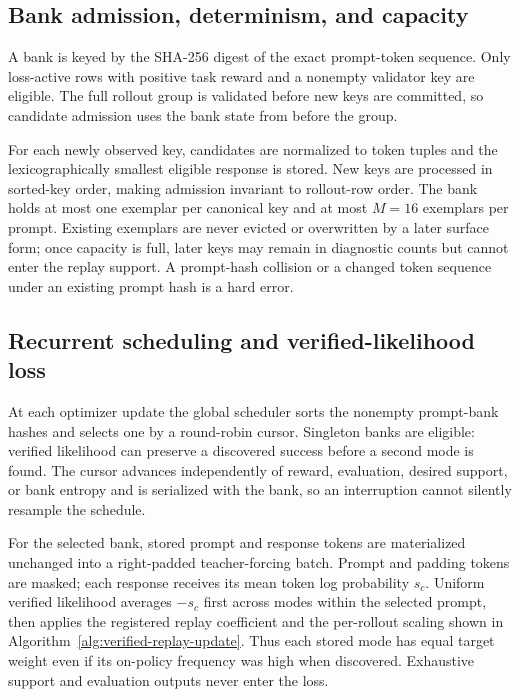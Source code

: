 \documentclass{article}
\newcommand{\1}{\mathbf 1}
\theoremstyle{remark}
\theoremstyle{definition}
\theoremstyle{plain}
\begin{document}
\subsection{Bank admission, determinism, and capacity}
\label{app:algorithm-bank}

A bank is keyed by the SHA-256 digest of the exact prompt-token sequence.
Only loss-active rows with positive task reward and a nonempty validator key
are eligible. The full rollout group is validated before new keys are
committed, so candidate admission uses the bank state from before the group.

For each newly observed key, candidates are normalized to token tuples and the
lexicographically smallest eligible response is stored. New keys are processed
in sorted-key order, making admission invariant to rollout-row order. The bank
holds at most one exemplar per canonical key and at most $M=16$ exemplars per
prompt. Existing exemplars are never evicted or overwritten by a later surface
form; once capacity is full, later keys may remain in diagnostic counts but
cannot enter the replay support. A prompt-hash collision or a changed token
sequence under an existing prompt hash is a hard error.

\subsection{Recurrent scheduling and verified-likelihood loss}
\label{app:algorithm-schedule}

At each optimizer update the global scheduler sorts the nonempty prompt-bank
hashes and selects one by a round-robin cursor. Singleton banks are eligible:
verified likelihood can preserve a discovered success before a second mode is
found. The cursor advances independently of reward, evaluation, desired
support, or bank entropy and is serialized with the bank, so an interruption
cannot silently resample the schedule.

For the selected bank, stored prompt and response tokens are materialized
unchanged into a right-padded teacher-forcing batch. Prompt and padding tokens
are masked; each response receives its mean token log probability $s_c$.
Uniform verified likelihood averages $-s_c$ first across modes within the
selected prompt, then applies the registered replay coefficient and the
per-rollout scaling shown in Algorithm~\ref{alg:verified-replay-update}.
Thus each stored mode has equal target weight even if its on-policy frequency
was high when discovered. Exhaustive support and evaluation outputs never enter
the loss.
\end{document}

